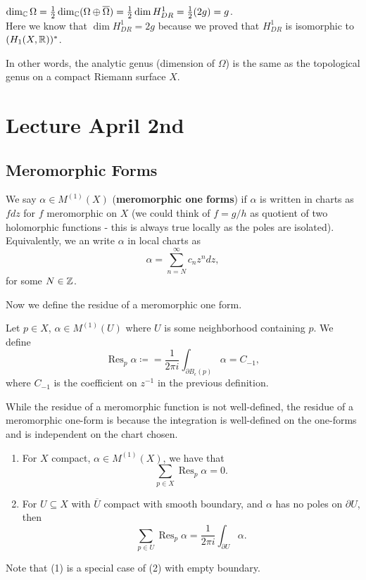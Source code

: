 \documentclass{article}
\begin{document}
{\begin{corollary}
    $\dim_{\mathbb{C}} \Omega = \frac{1}{2} \dim_{\mathbb{C}} (\Omega \oplus \overline{\Omega}) = \frac{1}{2} \dim H^1_{DR} = \frac{1}{2}(2g) = g$.\\

    Here we know that $\dim H^1_{DR} = 2g$ because we proved that $H^1_{DR}$ is isomorphic to $(H_1(X, \mathbb{R}))^*$.
\end{corollary}

In other words, the analytic genus (dimension of $\Omega$) is the same as the topological genus on a compact Riemann surface $X$.

\newpage
\section{Lecture April 2nd}

\subsection{Meromorphic Forms}

\begin{definition}
    We say $\alpha \in M^{(1)}(X)$ (\textbf{meromorphic one forms}) if $\alpha$ is written in charts as $f dz$ for $f$ meromorphic on $X$ (we could think of $f = g/h$ as quotient of two holomorphic functions - this is always true locally as the poles are isolated). Equivalently, we an write $\alpha$ in local charts as
    \[\alpha = \sum_{n = N}^\infty c_n z^n dz, \]
    for some $N \in \mathbb{Z}$.
\end{definition}

Now we define the residue of a meromorphic one form.
\begin{definition}
    Let $p \in X$, $\alpha \in M^{(1)}(U)$ where $U$ is some neighborhood containing $p$. We define 
    \[\operatorname{Res}_p \alpha \coloneqq = \frac{1}{2\pi i} \int_{\partial B_\epsilon(p)} \alpha = C_{-1},\]
    where $C_{-1}$ is the coefficient on $z^{-1}$ in the previous definition.
\end{definition}

\begin{remark}
    While the residue of a meromorphic function is not well-defined, the residue of a meromorphic one-form is because the integration is well-defined on the one-forms and is independent on the chart chosen.
\end{remark}

\begin{theorem}
    \begin{enumerate}
        \item For $X$ compact, $\alpha \in M^{(1)}(X)$, we have that
        \[\sum_{p \in X} \operatorname{Res}_p \alpha = 0.\]
        \item For $U \subseteq X$ with $\overline{U}$ compact with smooth boundary, and $\alpha$ has no poles on $\partial U$, then
        \[\sum_{p \in U} \operatorname{Res}_p \alpha = \frac{1}{2\pi i} \int_{\partial U} \alpha.\]
    \end{enumerate}
    Note that (1) is a special case of (2) with empty boundary.
\end{theorem}

}
\end{document}
